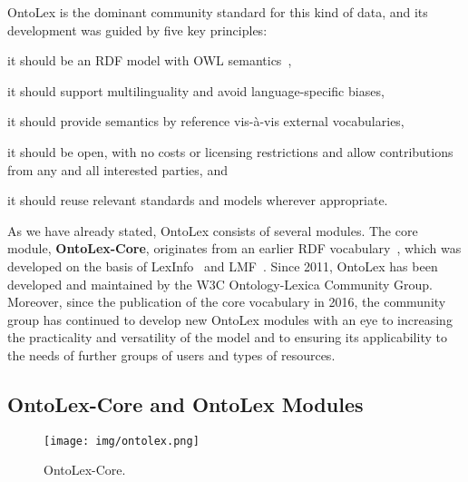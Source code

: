 \documentclass[output=paper,colorlinks,citecolor=brown]{langscibook}
\begin{document}

OntoLex is the dominant community standard for this kind of data, and its development was guided by five key principles:
\begin{inparaenum}[(1)]
\item it should be an RDF model with OWL semantics~\citep{owl:2004},
\item it should support multilinguality and avoid language-specific biases,
\item it should provide semantics by reference vis-à-vis external vocabularies,
\item it should be open, with no costs or licensing restrictions and allow contributions from any and all interested parties, and
\item it should reuse relevant standards and models wherever appropriate.
\end{inparaenum}
As we have already stated, OntoLex consists of several modules.
The core module, \textbf{OntoLex-Core}, originates from
an earlier RDF vocabulary~\citep{mccrae2010lemon}, %
which was developed on the basis of LexInfo~\citep{cimiano2011lexinfo} %
and LMF~\citep{francopoulo2009multilingual}.
Since 2011, OntoLex has been developed and maintained by the W3C Ontology-Lexica Community Group.
Moreover, since the publication of the core vocabulary in 2016,
the community group has continued to develop new OntoLex modules with an eye to increasing the practicality and versatility of the model and to ensuring its applicability to the needs of further groups of users
and types of resources. %

\subsection{OntoLex-Core and OntoLex Modules} %
\label{section:core_model}

\begin{figure}
    \centering
    \texttt{[image: img/ontolex.png]}
    \caption{OntoLex-Core.}
    \label{fig-ontolex}
\end{figure}
\end{document}
